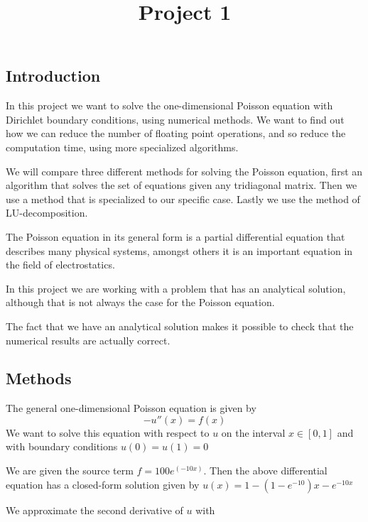 \documentclass[12pt]{article}
\begin{document}
\title{Project 1}
\maketitle

\subsection{Introduction}

In this project we want to solve the one-dimensional Poisson equation with Dirichlet boundary conditions, using numerical methods. We want to find out how we can reduce the number of floating point operations, and so reduce the computation time, using more specialized  algorithms.  

We will compare three different methods for solving the Poisson equation, first an algorithm that solves the set of equations given any tridiagonal matrix. Then we use a method that is specialized to our specific case. Lastly we use the method of LU-decomposition. 

The Poisson equation in its general form is a  partial differential equation that describes many physical systems, amongst others it is an important equation in the field of electrostatics.

In this project we are working with a problem that has an analytical solution, although that is not always the case for the Poisson equation. 

The fact that we have an analytical solution makes it possible to check that the numerical results are actually correct. 



\subsection{Methods}




The general one-dimensional Poisson equation is given by 
\begin{equation}
-u''(x) = f(x)
\end{equation}
We want to solve this equation with respect to $u$ on the interval $x \in [0,1]$ and with boundary conditions $u(0) = u(1) = 0$

We are given the source term $f  = 100e^{(-10x)}$. Then the above differential equation
has a closed-form  solution given by $u(x) = 1-(1-e^{-10})x-e^{-10x}$

We  approximate the second
derivative of $u$ with 
\end{document}
